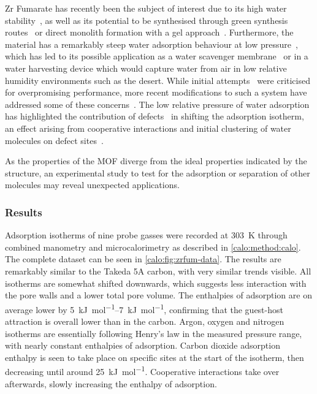 Zr Fumarate has recently been the subject of interest due to its
high water stability~\cite{zahnWaterbornZrbasedPorous2015}, 
as well as its potential to be synthesised through green synthesis
routes~\cite{reinschFacileGreenRoute2016} or direct
monolith formation with a gel approach~\cite{buekenGelbasedMorphologicalDesign2017}.
Furthermore, the material has a remarkably steep water adsorption
behaviour at low pressure~\cite{furukawaWaterAdsorptionPorous2014},
which has led to its possible application as a water scavenger 
membrane~\cite{baeTransparentMetalOrganic2016} or in a water 
harvesting device which would capture water from air in low relative
humidity environments such as the desert. While initial 
attempts~\cite{kimWaterHarvestingAir2017} were criticised for
overpromising performance, more recent modifications to such 
a system have addressed some of these 
concerns~\cite{kimAdsorptionbasedAtmosphericWater2018}.
The low relative pressure of water adsorption has highlighted
the contribution of defects~\cite{choiRoleStructuralDefects2018} in 
shifting the adsorption isotherm, an effect arising from cooperative
interactions and initial clustering of water molecules on defect
sites~\cite{vandichelWaterCoordinationDehydration2016}.

As the properties of the \gls{MOF} diverge from the ideal properties
indicated by the structure, an experimental study to test for the adsorption
or separation of other molecules may reveal unexpected 
applications.

\subsubsection{Results}

Adsorption isotherms of nine probe gasses were recorded at 
\SI{303}{\kelvin} through combined manometry and microcalorimetry
as described in \autoref{calo:method:calo}. The complete 
dataset can be seen in \autoref{calo:fig:zrfum-data}.
The results are remarkably similar to the Takeda 5A carbon, with 
very similar trends visible. All isotherms are somewhat 
shifted downwards, which suggests less interaction with the 
pore walls and a lower total pore volume. The enthalpies of 
adsorption are on average lower by \SIrange{5}{7}{\kilo\joule\per\mol},
confirming that the guest-host attraction is overall lower than
in the carbon. Argon, oxygen and nitrogen isotherms are essentially
following Henry's law in the measured pressure range, with nearly constant
enthalpies of adsorption. Carbon dioxide adsorption enthalpy is seen to take
place on specific sites at the start of the isotherm, then
decreasing until around \SI{25}{{\kilo\joule\per\mol}}. Cooperative
interactions take over afterwards, slowly increasing the enthalpy 
of adsorption.

